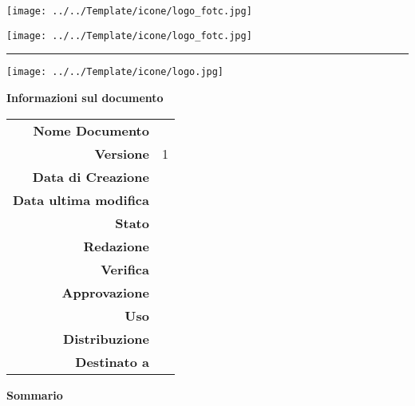 \begin{center}

\texttt{[image: ../../Template/icone/logo\_fotc.jpg]}
\begin{large} \textbf{\gruppo} \end{large}
\texttt{[image: ../../Template/icone/logo\_fotc.jpg]}
\vspace{0.2em}

\hrule
\vspace{3em}

\texttt{[image: ../../Template/icone/logo.jpg]}


\begin{center} 
  \begin{Huge}
  {\fontsize{15mm}{20mm}\selectfont \progetto} 
  \end{Huge}
\end{center}

\begin{Huge} \documento \end{Huge}

\begin{center}
\textbf{Informazioni sul documento} \\ \vspace{2em}
\small
\begin{tabular}{r|l}
	\textbf{Nome Documento} & \nomedocumentofisico \\
	\textbf{Versione}	& 1\\
	\textbf{Data di Creazione} & \datacreazione\\
	\textbf{Data ultima modifica} & \datamodifica\\
	\textbf{Stato} & \stato \\
	\textbf{Redazione}	& \redazione\\
	\textbf{Verifica}	& \verifica\\
	\textbf{Approvazione}	& \approvazione\\
	\textbf{Uso}  & \uso\\
	\textbf{Distribuzione} & \gruppo \\
	\textbf{Destinato a}  &  \destinateTo
\end{tabular}
\end{center}
\normalsize

\vspace{4em}

\textbf{Sommario\\} 


\vfill

\end{center}

